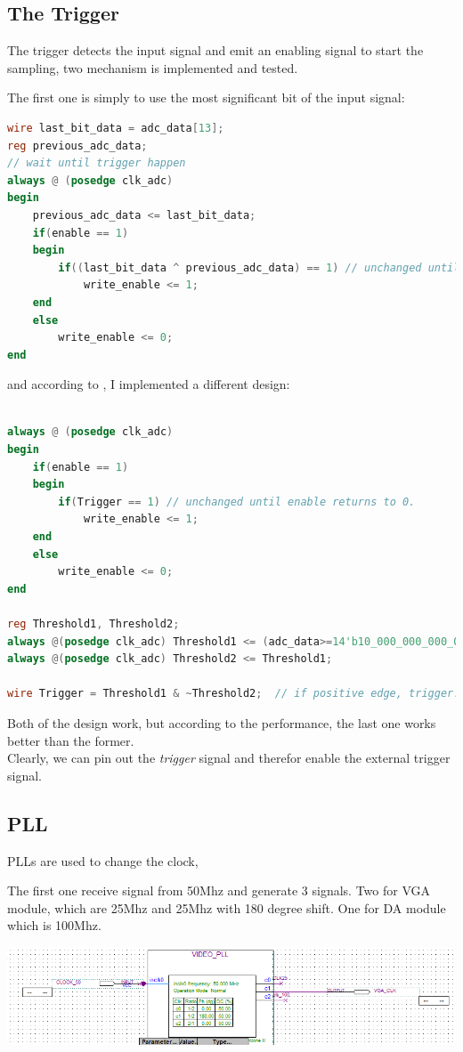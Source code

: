 \documentclass[11pt]{scrartcl}
\begin{document}
\subsection{The Trigger}
\label{sec:trigger}
The trigger detects the input signal and emit an enabling signal to start the sampling, two mechanism is implemented and tested.


The first one is simply to use the most significant bit of the input signal:

\begin{lstlisting}[language=Verilog]
wire last_bit_data = adc_data[13];
reg previous_adc_data;
// wait until trigger happen
always @ (posedge clk_adc)
begin
	previous_adc_data <= last_bit_data;
	if(enable == 1)
	begin
		if((last_bit_data ^ previous_adc_data) == 1) // unchanged until enable returns to 0.
			write_enable <= 1;
	end
	else
		write_enable <= 0;
end
\end{lstlisting}

and according to \cite{trigger}, I implemented a different design:

\begin{lstlisting}[language=Verilog]

always @ (posedge clk_adc)
begin
	if(enable == 1)
	begin
		if(Trigger == 1) // unchanged until enable returns to 0.
			write_enable <= 1;
	end
	else
		write_enable <= 0;
end

reg Threshold1, Threshold2;
always @(posedge clk_adc) Threshold1 <= (adc_data>=14'b10_000_000_000_000);
always @(posedge clk_adc) Threshold2 <= Threshold1;

wire Trigger = Threshold1 & ~Threshold2;  // if positive edge, trigger! 
\end{lstlisting}

Both of the design work, but according to the performance, the last one works better than the former.\\

Clearly, we can pin out the \textit{trigger} signal and therefor enable the external trigger signal.
\subsection{PLL}

PLLs are used to change the clock,

The first one receive signal from 50Mhz and generate 3 signals. Two for VGA module, which are 25Mhz and 25Mhz with 180 degree shift. One for DA module which is 100Mhz.

\begin{minipage}[t]{\linewidth}

{
\includegraphics[scale = 0.5]{pll1.png}
}
\end{minipage}
\medskip
\end{document}
